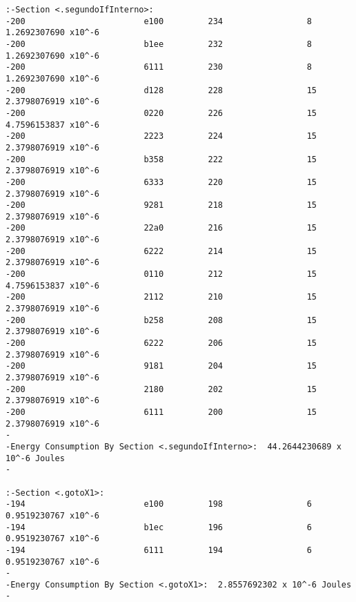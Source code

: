 \begin{verbatim}
:-Section <.segundoIfInterno>:  
-200                        e100         234                 8              1.2692307690 x10^-6 
-200                        b1ee         232                 8              1.2692307690 x10^-6 
-200                        6111         230                 8              1.2692307690 x10^-6 
-200                        d128         228                 15              2.3798076919 x10^-6 
-200                        0220         226                 15              4.7596153837 x10^-6 
-200                        2223         224                 15              2.3798076919 x10^-6 
-200                        b358         222                 15              2.3798076919 x10^-6 
-200                        6333         220                 15              2.3798076919 x10^-6 
-200                        9281         218                 15              2.3798076919 x10^-6 
-200                        22a0         216                 15              2.3798076919 x10^-6 
-200                        6222         214                 15              2.3798076919 x10^-6 
-200                        0110         212                 15              4.7596153837 x10^-6 
-200                        2112         210                 15              2.3798076919 x10^-6 
-200                        b258         208                 15              2.3798076919 x10^-6 
-200                        6222         206                 15              2.3798076919 x10^-6 
-200                        9181         204                 15              2.3798076919 x10^-6 
-200                        2180         202                 15              2.3798076919 x10^-6 
-200                        6111         200                 15              2.3798076919 x10^-6 
-                                                                                          
-Energy Consumption By Section <.segundoIfInterno>:  44.2644230689 x 10^-6 Joules
-                                                                                          

:-Section <.gotoX1>:  
-194                        e100         198                 6              0.9519230767 x10^-6 
-194                        b1ec         196                 6              0.9519230767 x10^-6 
-194                        6111         194                 6              0.9519230767 x10^-6 
-                                                                                          
-Energy Consumption By Section <.gotoX1>:  2.8557692302 x 10^-6 Joules
-                                                                                          


\end{verbatim}
